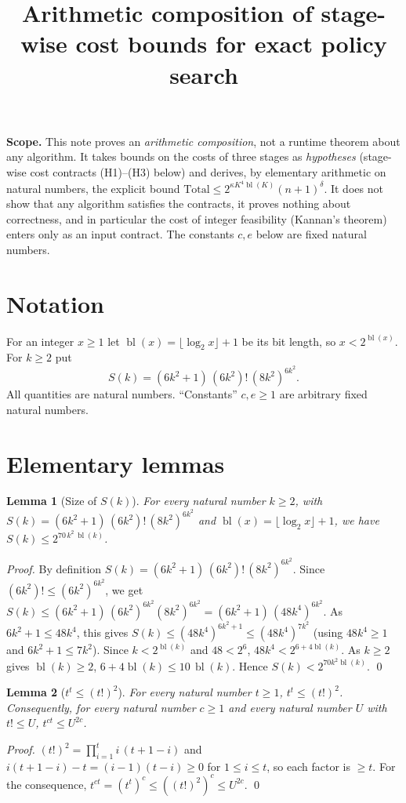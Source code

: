 \documentclass[11pt]{article}
\title{Arithmetic composition of stage-wise cost bounds for exact policy search}
\author{}
\date{}
\newtheorem{lemma}{Lemma}
\newcommand{\bl}{\operatorname{bl}}
\begin{document}
\maketitle

\noindent\textbf{Scope.} This note proves an \emph{arithmetic composition}, not a runtime theorem about any algorithm. It takes bounds on the costs of three stages as \emph{hypotheses} (stage-wise cost contracts (H1)--(H3) below) and derives, by elementary arithmetic on natural numbers, the explicit bound $\mathrm{Total}\le2^{\kappa K^4\bl(K)}(n+1)^{\delta}$. It does not show that any algorithm satisfies the contracts, it proves nothing about correctness, and in particular the cost of integer feasibility (Kannan's theorem) enters only as an input contract. The constants $c,e$ below are fixed natural numbers.

\section{Notation}

For an integer $x\ge1$ let $\bl(x)=\lfloor\log_2x\rfloor+1$ be its bit length, so $x<2^{\bl(x)}$. For $k\ge2$ put
\[
S(k)=(6k^2+1)\,(6k^2)!\,(8k^2)^{6k^2}.
\]
All quantities are natural numbers. ``Constants'' $c,e\ge1$ are arbitrary fixed natural numbers.

\section{Elementary lemmas}

\begin{lemma}[Size of $S(k)$]\label{lem:S}
For every natural number $k\ge2$, with $S(k)=(6k^2+1)\,(6k^2)!\,(8k^2)^{6k^2}$ and $\bl(x)=\lfloor\log_2x\rfloor+1$, we have $S(k)\le 2^{70\,k^2\,\bl(k)}$.
\end{lemma}
\begin{proof}
By definition $S(k)=(6k^2+1)\,(6k^2)!\,(8k^2)^{6k^2}$. Since $(6k^2)!\le(6k^2)^{6k^2}$, we get $S(k)\le(6k^2+1)\,(6k^2)^{6k^2}(8k^2)^{6k^2}=(6k^2+1)\,(48k^4)^{6k^2}$. As $6k^2+1\le48k^4$, this gives $S(k)\le(48k^4)^{6k^2+1}\le(48k^4)^{7k^2}$ (using $48k^4\ge1$ and $6k^2+1\le7k^2$). Since $k<2^{\bl(k)}$ and $48<2^6$, $48k^4<2^{6+4\bl(k)}$. As $k\ge2$ gives $\bl(k)\ge2$, $6+4\bl(k)\le 10\,\bl(k)$. Hence $S(k)<2^{70k^2\bl(k)}$. \qed
\end{proof}

\begin{lemma}[$t^t\le(t!)^2$]\label{lem:tt}
For every natural number $t\ge1$, $t^t\le(t!)^2$. Consequently, for every natural number $c\ge1$ and every natural number $U$ with $t!\le U$, $t^{ct}\le U^{2c}$.
\end{lemma}
\begin{proof}
$(t!)^2=\prod_{i=1}^{t}i\,(t+1-i)$ and $i(t+1-i)-t=(i-1)(t-i)\ge0$ for $1\le i\le t$, so each factor is $\ge t$. For the consequence, $t^{ct}=(t^t)^c\le((t!)^2)^c\le U^{2c}$. \qed
\end{proof}
\end{document}
